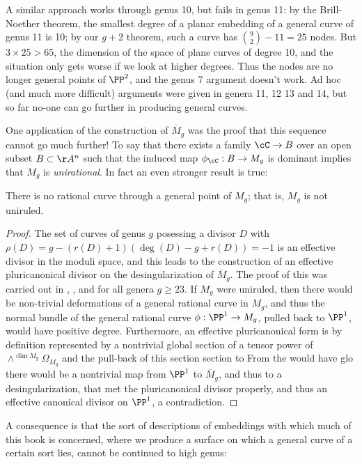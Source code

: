 A similar approach works through genus 10, but fails in genus 11: by the Brill-Noether theorem, the smallest degree of a planar embedding of a general curve of genus 11 is 10; by our $g+2$ theorem, such a curve has ${9\choose 2}-11 = 25$ nodes. But $3 \times 25 > 65$, the dimension of the space of plane curves of degree 10, and the situation only gets worse if we look at higher degrees. Thus the nodes are no longer general points of $\PP^2$, and the genus 7 argument doesn't work. 
 Ad hoc (and much more difficult) arguments were given in genera 11, 12 13 and 14, but so far no-one can go further in producing general curves. 

One application of the construction of $\overline M_g$ was the proof that this sequence cannot go much further! To say that there exists a family $\cC \to B$ over an open subset $B \subset \AA^n$ such that the induced map $\phi_\cC : B \to M_g$ is dominant implies that $M_g$ is \emph{unirational}.  In fact an even stronger result is true:

\begin{theorem}
There is no rational curve through a general point of $M_g$; that is, $M_g$ is not uniruled.
\end{theorem}
\begin{proof}
The set of curves of genus $g$ posessing a divisor $D$ with $\rho(D) = g - (r(D)+1)(\deg(D) -g + r(D)) = -1$ is an effective divisor
in the moduli space, and this leads to the construction of an effective pluricanonical divisor on the desingularization of $\overline M_g$. The proof of this
was carried out in
\cite{Harris-Mumford-Moduli}, \cite{HarrisModuli}, and \cite{Eisenbud-HarrisModuli}
 for all genera $g \geq 23$.
If $M_g$ were uniruled, then there would be non-trivial deformations of a general rational curve in $M_g$, 
and thus the normal bundle of the general rational curve $\phi: \PP^1 \to M_g$, pulled back to $\PP^1$, would have positive degree. 
Furthermore, an effective pluricanonical form is by definition represented by a nontrivial global section of a tensor power
of $\wedge^{\dim M_g}\Omega_{M_g}$ and the pull-back of this section section to From the  would have glo there would be a nontrivial map from $\PP^1$ to $\overline M_g$, and thus to a desingularization, that met the pluricanonical divisor properly, and thus an effective canonical divisor on $\PP^1$, a contradiction.
\end{proof}
 
 A consequence is that the sort of descriptions of embeddings with which much of this book is concerned, where we produce a surface on which a general curve of a certain sort lies, cannot be continued to high genus:

